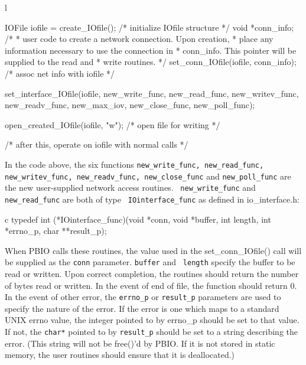 \documentclass{article}
\begin{document}
\begin{code}{l}
{
    IOFile iofile = create_IOfile();  /* initialize IOfile structure */
    void *conn_info;
    /*
     * user code to create a network connection.  Upon creation,
     * place any information necessary to use the connection in
     * conn_info.  This pointer will be supplied to the read and 
     * write routines.
     */
    set_conn_IOfile(iofile, conn_info);  /* assoc net info with iofile */

    set_interface_IOfile(iofile, new_write_func, new_read_func,
                         new_writev_func, new_readv_func, new_max_iov,
                         new_close_func, new_poll_func);

    open_created_IOfile(iofile, "w");  /* open file for writing */

    /* after this, operate on iofile with normal calls */
}
\end{code}
\sloppy In the code above, the six functions {\tt new\_write\_func,
new\_read\_func, new\_writev\_func, new\_readv\_func, new\_close\_func} and
{\tt new\_poll\_func} are the new user-supplied network access routines.  {\tt
new\_write\_func} and {\tt new\_read\_func} are both of type {\tt
IOinterface\_func} as defined in io\_interface.h:
\begin{code}{c}
typedef int (*IOinterface_func)(void *conn, void *buffer, int length,
                                int *errno_p, char **result_p);
\end{code}
When PBIO calls these routines, the value used in the set\_conn\_IOfile()
call will be supplied as the {\tt conn} parameter.  {\tt buffer} and  {\tt
length} specify the buffer to be read or written.  Upon correct completion,
the routines should return the number of bytes read or written.  In the event
of end of file, the function should return 0.  In the event of other error,
the {\tt errno\_p} or {\tt result\_p} parameters are used to specify the nature
of the error.  If the error is one which maps to a standard UNIX errno value,
the integer pointed to by errno\_p should be set to that value.  If not, the
{\tt char*} pointed to by {\tt result\_p} should be set to a string describing
the error.  (This string will not be free()'d by PBIO.  If it is not stored
in static memory, the user routines should ensure that it is deallocated.)
\end{document}
